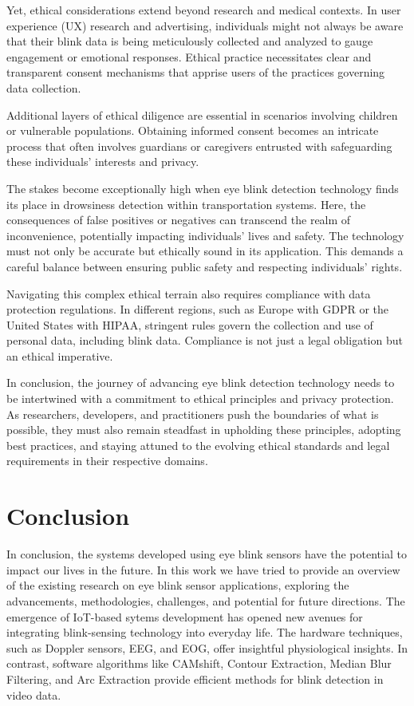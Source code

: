 \documentclass[conference]{IEEEtran}
\begin{document}
Yet, ethical considerations extend beyond research and medical contexts. In user experience (UX) research and advertising, individuals might not always be aware that their blink data is being meticulously collected and analyzed to gauge engagement or emotional responses. Ethical practice necessitates clear and transparent consent mechanisms that apprise users of the practices governing data collection.

Additional layers of ethical diligence are essential in scenarios involving children or vulnerable populations. Obtaining informed consent becomes an intricate process that often involves guardians or caregivers entrusted with safeguarding these individuals' interests and privacy.

The stakes become exceptionally high when eye blink detection technology finds its place in drowsiness detection within transportation systems. Here, the consequences of false positives or negatives can transcend the realm of inconvenience, potentially impacting individuals' lives and safety. The technology must not only be accurate but ethically sound in its application. This demands a careful balance between ensuring public safety and respecting individuals' rights.

Navigating this complex ethical terrain also requires compliance with data protection regulations. In different regions, such as Europe with GDPR or the United States with HIPAA, stringent rules govern the collection and use of personal data, including blink data. Compliance is not just a legal obligation but an ethical imperative.

In conclusion, the journey of advancing eye blink detection technology needs to be intertwined with a commitment to ethical principles and privacy protection. As researchers, developers, and practitioners push the boundaries of what is possible, they must also remain steadfast in upholding these principles, adopting best practices, and staying attuned to the evolving ethical standards and legal requirements in their respective domains.

\section{Conclusion}

In conclusion, the systems developed using eye blink sensors have the potential to impact our lives in the future. In this work we have tried to provide an overview of the existing research on eye blink sensor applications, exploring the advancements, methodologies, challenges, and potential for future directions. The emergence of IoT-based sytems development has opened new avenues for integrating blink-sensing technology into everyday life. The hardware techniques, such as Doppler sensors, EEG, and EOG, offer insightful physiological insights. In contrast, software algorithms like CAMshift, Contour Extraction, Median Blur Filtering, and Arc Extraction provide efficient methods for blink detection in video data.
\end{document}
